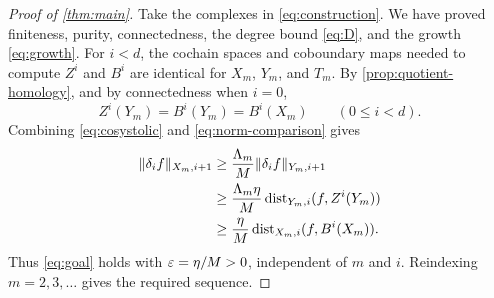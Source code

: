\begin{proof}[Proof of \cref{thm:main}]
Take the complexes in \eqref{eq:construction}. We have proved finiteness,
purity, connectedness, the degree bound \eqref{eq:D}, and the growth
\eqref{eq:growth}. For $i<d$, the cochain spaces and coboundary maps
needed to compute $Z^i$ and $B^i$ are identical for $X_m$, $Y_m$, and
$T_m$. By \cref{prop:quotient-homology}, and by connectedness when $i=0$,
\[
 Z^i(Y_m)=B^i(Y_m)=B^i(X_m)\qquad(0\le i<d).
\]
Combining \eqref{eq:cosystolic} and \eqref{eq:norm-comparison} gives
\begin{align*}
 \lVert\delta_i f\rVert_{X_m,i+1}
 &\ge\frac{\Lambda_m}{M}\lVert\delta_i f\rVert_{Y_m,i+1}\\
 &\ge\frac{\Lambda_m\eta}{M}\operatorname{dist}_{Y_m,i}(f,Z^i(Y_m))\\
 &\ge\frac{\eta}{M}\operatorname{dist}_{X_m,i}(f,B^i(X_m)).
\end{align*}
Thus \eqref{eq:goal} holds with $\varepsilon=\eta/M>0$, independent of $m$
and $i$. Reindexing $m=2,3,\ldots$ gives the required sequence.
\end{proof}
